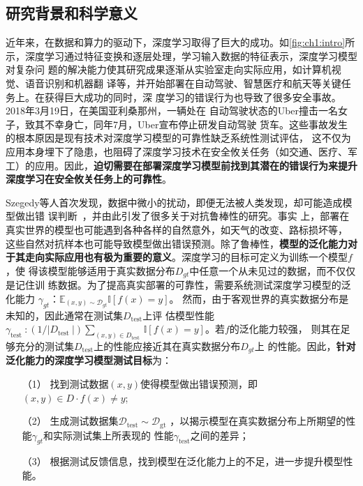 
\subsection{研究背景和科学意义}



%
近年来，在数据和算力的驱动下，深度学习取得了巨大的成功。如\cref{fig:ch1:intro}所
示，深度学习通过特征变换和逐层处理，学习输入数据的特征表示，深度学习模型对复杂问
题的解决能力使其研究成果逐渐从实验室走向实际应用，如计算机视觉、语音识别和机器翻
译等，并开始部署在自动驾驶、智慧医疗和航天等关键任务上。在获得巨大成功的同时，深
度学习的错误行为也导致了很多安全事故。2018年3月19日，在美国亚利桑那州，一辆处在
自动驾驶状态的Uber撞击一名女子，致其不幸身亡，同年7月，Uber宣布停止研发自动驾驶
货车。这些事故发生的根本原因是现有技术对深度学习模型的可靠性缺乏系统性测试评估，
这不仅为应用本身埋下了隐患，也阻碍了深度学习技术在安全攸关任务（如交通、医疗、军
工）的应用。因此，\textbf{迫切需要在部署深度学习模型前找到其潜在的错误行为来提升
深度学习在安全攸关任务上的可靠性}。

Szegedy等人首次发现，数据中微小的扰动，即便无法被人类发现，却可能造成模型做出错
误判断~\cite{szegedy2013intriguing}，并由此引发了很多关于对抗鲁棒性的研究。事实
上，部署在真实世界的模型也可能遇到各种各样的自然意外，如天气的改变、路标损坏等，
这些自然对抗样本也可能导致模型做出错误预测。除了鲁棒性，\textbf{模型的泛化能力对
于其走向实际应用也有极为重要的意义}。深度学习的目标可定义为训练一个模型${f}$，使
得该模型能够适用于真实数据分布$D_{gt}$中任意一个从未见过的数据，而不仅仅是记住训
练数据。为了提高真实部署的可靠性，需要系统测试深度学习模型的泛化能力
$\gamma_{gt}$：$\mathbb{E}_{(x, y) \sim \mathcal{D}_{g t}} \mathbb{I}[f(x)=y]$。
然而，由于客观世界的真实数据分布是未知的，因此通常在测试集$D_{\text{test}}$上评
估模型性能$\gamma_{\text {test }}:\left(1 /\left|D_{\text {test }}\right|\right)
\sum_{(x, y) \in D_{\text {test }}} \mathbb{I}[f(x)=y]$。若${f}$的泛化能力较强，
则其在足够充分的测试集$D_{\text{test}}$上的性能应接近其在真实数据分布$D_{gt}$上
的性能。因此，\textbf{针对泛化能力的深度学习模型测试目标}为：
\begin{itemize}
    \item[（1）] 找到测试数据$(x, y)$使得模型做出错误预测，即$(x, y) \in D \cdot f(x)
    \neq y$;
    \item[（2）] 生成测试数据集$\mathcal{D}_{\text{test}} \sim \mathcal{D}_{\text{gt}}$
    ，以揭示模型在真实数据分布上所期望的性能$\gamma_{gt}$和实际测试集上所表现的
    性能$\gamma_{\text{test}}$之间的差异；
    \item[（3）] 根据测试反馈信息，找到模型在泛化能力上的不足，进一步提升模型性能。
\end{itemize}

